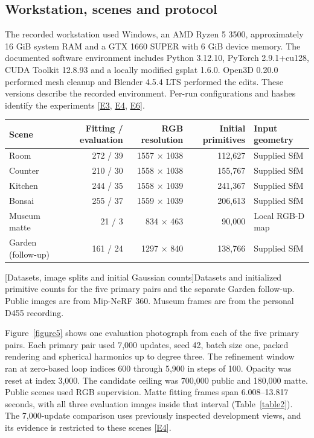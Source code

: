 \documentclass[11pt,a4paper]{article}
\begin{document}
\subsection{Workstation, scenes and protocol}
The recorded workstation used Windows, an AMD Ryzen 5 3500, approximately 16 GiB system RAM and a GTX 1660 SUPER with 6 GiB device memory. The documented software environment includes Python 3.12.10, PyTorch 2.9.1+cu128, CUDA Toolkit 12.8.93 and a locally modified gsplat 1.6.0. Open3D 0.20.0 performed mesh cleanup and Blender 4.5.4 LTS performed the edits. These versions describe the recorded environment. Per-run configurations and hashes identify the experiments [\hyperlink{evE3}{E3}, \hyperlink{evE4}{E4}, \hyperlink{evE6}{E6}].\par
\begin{center}\begin{minipage}{\linewidth}
\centering\small\setlength{\tabcolsep}{4pt}
\begin{tabular*}{\linewidth}{@{\extracolsep{\fill}}lrrrl@{}}
\toprule
\textbf{Scene} & \textbf{Fitting / evaluation} & \textbf{RGB resolution} & \textbf{Initial primitives} & \textbf{Input geometry} \\
\midrule
Room & 272 / 39 & 1557 \ensuremath{\times} 1038 & 112,627 & Supplied SfM \\
Counter & 210 / 30 & 1558 \ensuremath{\times} 1038 & 155,767 & Supplied SfM \\
Kitchen & 244 / 35 & 1558 \ensuremath{\times} 1039 & 241,367 & Supplied SfM \\
Bonsai & 255 / 37 & 1559 \ensuremath{\times} 1039 & 206,613 & Supplied SfM \\
Museum matte & 21 / 3 & 834 \ensuremath{\times} 463 & 90,000 & Local RGB-D map \\
\midrule
Garden (follow-up) & 161 / 24 & 1297 \ensuremath{\times} 840 & 138,766 & Supplied SfM \\
\bottomrule
\end{tabular*}\par
{}[Datasets, image splits and initial Gaussian counts]{Datasets and initialized primitive counts for the five primary pairs and the separate Garden follow-up. Public images are from Mip-NeRF 360. Museum frames are from the personal D455 recording.}\label{table2}
\end{minipage}\end{center}
Figure~\ref{figure5} shows one evaluation photograph from each of the five primary pairs. Each primary pair used 7,000 updates, seed 42, batch size one, packed rendering and spherical harmonics up to degree three. The refinement window ran at zero-based loop indices 600 through 5,900 in steps of 100. Opacity was reset at index 3,000. The candidate ceiling was 700,000 public and 180,000 matte. Public scenes used RGB supervision. Matte fitting frames span 6.008--13.817 seconds, with all three evaluation images inside that interval (Table~\ref{table2}). The 7,000-update comparison uses previously inspected development views, and its evidence is restricted to these scenes [\hyperlink{evE4}{E4}].\par
\end{document}
